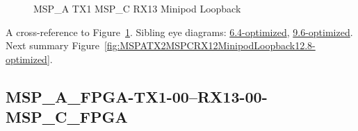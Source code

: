 \begin{figure}[h]
\begin{subfigure}{0.33\textwidth}
\hyperref[sec:MSPAFPGATX106RX1306MSPCFPGA12.8-optimized]{}
\end{subfigure}\hspace*{\fill}
\begin{subfigure}{0.33\textwidth}
\hyperref[sec:MSPAFPGATX107RX1307MSPCFPGA12.8-optimized]{}
\end{subfigure}\hspace*{\fill}
\begin{subfigure}{0.33\textwidth}
\hyperref[sec:MSPAFPGATX108RX1308MSPCFPGA12.8-optimized]{}
\end{subfigure}

\begin{subfigure}{0.33\textwidth}
\hyperref[sec:MSPAFPGATX109RX1309MSPCFPGA12.8-optimized]{}
\end{subfigure}\hspace*{\fill}
\begin{subfigure}{0.33\textwidth}
\hyperref[sec:MSPAFPGATX110RX1310MSPCFPGA12.8-optimized]{}
\end{subfigure}\hspace*{\fill}
\begin{subfigure}{0.33\textwidth}
\hyperref[sec:MSPAFPGATX111RX1311MSPCFPGA12.8-optimized]{}
\end{subfigure}

\caption{MSP\_A TX1 MSP\_C RX13 Minipod Loopback} \label{fig:MSPATX1MSPCRX13MinipodLoopback12.8-optimized}
\end{figure}

A cross-reference to Figure~\ref{fig:MSPATX1MSPCRX13MinipodLoopback12.8-optimized}.
Sibling eye diagrams: \hyperref[sec:MSPATX1MSPCRX13MinipodLoopback6.4-optimized]{6.4-optimized}, \hyperref[sec:MSPATX1MSPCRX13MinipodLoopback9.6-optimized]{9.6-optimized}. \\
Next summary Figure~\ref{fig:MSPATX2MSPCRX12MinipodLoopback12.8-optimized}.
\clearpage
% 
\subsection{MSP\_A\_FPGA-TX1-00--RX13-00-MSP\_C\_FPGA}\label{sec:MSPAFPGATX100RX1300MSPCFPGA12.8-optimized}

